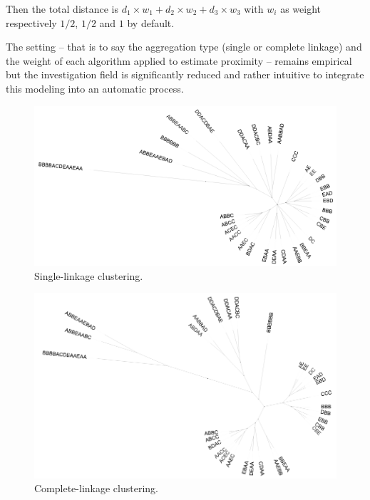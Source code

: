 Then the total distance is $d_1 \times w_1 + d_2 \times w_2 + d_3 \times w_3$ with $w_i$ as weight respectively $1/2$, $1/2$ and $1$ by default.

\smallskip

The setting -- that is to say the aggregation type (single or complete linkage) and the weight of each algorithm applied to estimate proximity -- remains empirical but the investigation field is significantly reduced and rather intuitive to integrate this modeling into an automatic process.

\smallskip

\begin{figure}[!hbt]
	\begin{center}
		\includegraphics[scale=0.37]{img/5521}
		\caption{Single-linkage clustering.}
		\label{fig:hc1}
	\end{center}
\end{figure}
	
\begin{figure}[!hbt]
	\begin{center}
		\includegraphics[scale=0.44]{img/5522}
		\caption{Complete-linkage clustering.}
		\label{fig:hc2}
	\end{center}
\end{figure}
	
